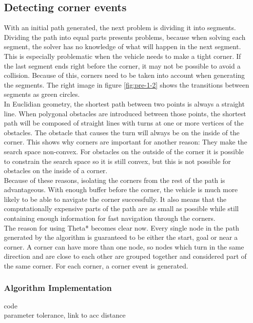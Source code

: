 \subsection{Detecting corner events}
With an initial path generated, the next problem is dividing it into segments. Dividing the path into equal parts presents problems, because when solving each segment, the solver has no knowledge of what will happen in the next segment. This is especially problematic when the vehicle needs to make a tight corner. If the last segment ends right before the corner, it may not be possible to avoid a collision. Because of this, corners need to be taken into account when generating the segments. The right image in figure \ref{fig:pre-1-2} shows the transitions between segments as green circles.\\
In Euclidian geometry, the shortest path between two points is always a straight line. When polygonal obstacles are introduced between those points, the shortest path will be composed of straight lines with turns at one or more vertices of the obstacles. The obstacle that causes the turn will always be on the inside of the corner. This shows why corners are important for another reason: They make the search space non-convex. For obstacles on the outside of the corner it is possible to constrain the search space so it is still convex, but this is not possible for obstacles on the inside of a corner.\\
Because of these reasons, isolating the corners from the rest of the path is advantageous. With enough buffer before the corner, the vehicle is much more likely to be able to navigate the corner successfully. It also means that the computationally expensive parts of the path are as small as possible while still containing enough information for fast navigation through the corners.
\\
The reason for using Theta* becomes clear now. Every single node in the path generated by the algorithm is guaranteed to be either the start, goal or near a corner. A corner can have more than one node, so nodes which turn in the same direction and are close to each other are grouped together and considered part of the same corner. For each corner, a corner event is generated.

\subsubsection{Algorithm Implementation}
code \\
parameter tolerance, link to acc distance\\
